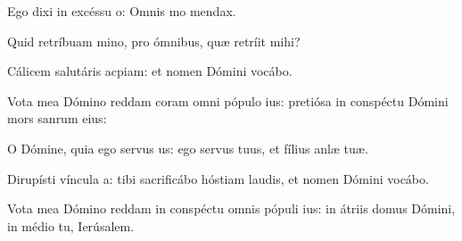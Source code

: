 \item {}

\item Ego dixi in excéssu o:\psstar{} Omnis mo mendax.

\item Quid retríbuam mino,\psstar{} pro ómnibus, quæ retríit mihi?

\item Cálicem salutáris acpiam:\psstar{} et nomen Dómini vocábo.

\item Vota mea Dómino reddam coram omni pópulo ius:\psstar{} pretiósa in conspéctu Dómini mors sanrum eius:

\item O Dómine, quia ego servus us:\psstar{} ego servus tuus, et fílius anlæ tuæ.

\item Dirupísti víncula a:\psstar{} tibi sacrificábo hóstiam laudis, et nomen Dómini vocábo.

\item Vota mea Dómino reddam in conspéctu omnis pópuli ius:\psstar{} in átriis domus Dómini, in médio tu, Ierúsalem.
